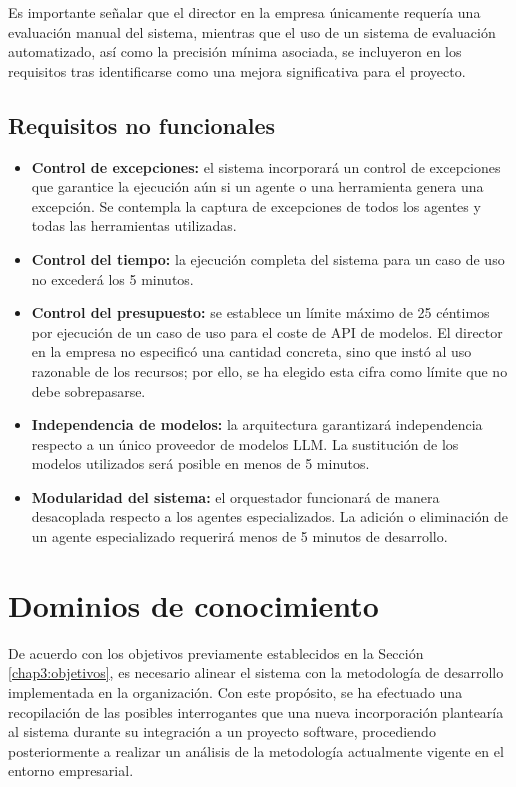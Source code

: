Es importante señalar que el director en la empresa únicamente requería una evaluación manual del sistema, mientras que el uso de un sistema de evaluación automatizado, así como la precisión mínima asociada, se incluyeron en los requisitos tras identificarse como una mejora significativa para el proyecto.
\subsection{Requisitos no funcionales}
\begin{itemize}
\item\textbf{Control de excepciones: }el sistema incorporará un control de excepciones que garantice la ejecución aún si un agente o una herramienta genera una excepción. Se contempla la captura de excepciones de todos los agentes y todas las herramientas utilizadas.
\item\textbf{Control del tiempo: }la ejecución completa del sistema para un caso de uso no excederá los 5 minutos.
\item\textbf{Control del presupuesto: }se establece un límite máximo de 25 céntimos por ejecución de un caso de uso para el coste de API de modelos. El director en la empresa no especificó una cantidad concreta, sino que instó al uso razonable de los recursos; por ello, se ha elegido esta cifra como límite que no debe sobrepasarse.
\item\textbf{Independencia de modelos: }la arquitectura garantizará independencia respecto a un único proveedor de modelos LLM. La sustitución de los modelos utilizados será posible en menos de 5 minutos.
\item\textbf{Modularidad del sistema: }el orquestador funcionará de manera desacoplada respecto a los agentes especializados. La adición o eliminación de un agente especializado requerirá menos de 5 minutos de desarrollo.
\end{itemize}

\section{Dominios de conocimiento}
De acuerdo con los objetivos previamente establecidos en la Sección \ref{chap3:objetivos}, es necesario alinear el sistema con la metodología de desarrollo implementada en la organización. Con este propósito, se ha efectuado una recopilación de las posibles interrogantes que una nueva incorporación plantearía al sistema durante su integración a un proyecto software, procediendo posteriormente a realizar un análisis de la metodología actualmente vigente en el entorno empresarial.


